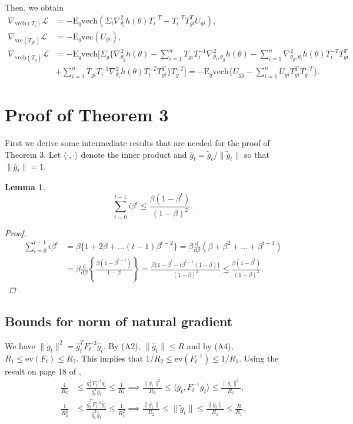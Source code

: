\documentclass{statsoc}
\newtheorem{lemma}{Lemma}
\newcommand\ev{{\text{ev}} }
\newcommand\df{{\text{d}}}
\newcommand\E{{\text{E}}}
\newcommand\mL{{\mathcal{L}}}
\newcommand{\vc}{\text{vec}}
\newcommand{\vech}{\text{vech}}
\begin{document}
Then, we obtain
\[
\begin{aligned}
\nabla_{\vech(T_i)} \mL &= - \E_q \vech (\Sigma_i  \nabla_{\theta_i}^2 h(\theta)  T_i^{-T} - T_i^{-T} T_{gi}^T U_{gi} ), \\
\nabla_{\vc(T_{gi})} \mL &= -\E_q \vc (U_{gi}), \\
\nabla_{\vech(T_g)} \mL &= - \E_q \vech\bigg[ \Sigma_g \bigg\{  \nabla_{\theta_g}^2 h(\theta) - \sum_{i=1}^n T_{gi} T_i^{-1} \nabla_{\theta_i, \theta_g}^2 h(\theta)  - \sum_{i=1}^n \nabla_{\theta_g, \theta_i}^2 h(\theta)T_i^{-T} T_{gi}^T \\
& +  \sum_{i=1}^n T_{gi} T_i^{-1} \nabla_{\theta_i}^2 h(\theta) T_i^{-T} T_{gi}^T \bigg\} T_g^{-T}\bigg] =- \E_q \vech \bigg\{ U_{gg} -  \sum_{i=1}^n U_{gi} T_{gi}^T T_g^{-T}\bigg\} .
\end{aligned}
\]




\section{Proof of Theorem 3} \label{S5}
First we derive some intermediate results that are needed for the proof of Theorem 3. Let $\langle \cdot, \cdot\rangle$ denote the inner product and $\bar{g}_{t}  = \widetilde{g}_t/\|\widetilde{g}_t\|$ so that $\|\bar{g}_t\| = 1$. 


\begin{lemma} \label{lem_beta}
\[
\sum_{i=0}^{t-1} i \beta^i \leq \frac{\beta(1-\beta^t)}{(1-\beta)^2}.
\]
\begin{proof}
\[
\begin{aligned}
\sum_{i=0}^{t-1} i \beta^i &= \beta \{1 + 2\beta + \dots (t-1) \beta^{t-2}\}
= \beta \frac{\df}{\df \beta} (\beta + \beta^2 + \dots + \beta^{t-1}) \\
&= \beta \frac{\df}{\df \beta} \left\{ \frac{\beta(1-\beta^{t-1})}{1-\beta} \right\}
= \frac{\beta \{1 - \beta^t - t \beta^{t-1} (1-\beta)\} }{(1-\beta)^2} \leq \frac{\beta(1-\beta^t)}{(1-\beta)^2}.
\end{aligned}
\]
\end{proof}
\end{lemma}


\subsection{Bounds for norm of natural gradient} 
We have $\| \widetilde{g}_t \|^2 = \widehat{g}_t^T  F_t^{-2}\widehat{g}_t$.  By (A2), $\|\widehat{g}_t\| \leq R$ and by (A4), $R_1 \leq \ev(F_t) \leq R_2$. This implies that $1/R_2 \leq \ev(F_t^{-1}) \leq 1/R_1$. Using the result on page 18 of \cite{Magnus2019},
\[
\begin{aligned}
\frac{1}{R_2} &\leq \frac{g_t^T  F_t^{-1}g_t}{g_t^T g_t} \leq \frac{1}{R_1}  
\implies \frac{\|g_t\|^2}{R_2} \leq \langle g_t, F_t^{-1}g_t \rangle  \leq \frac{\|g_t\|^2}{R_1}, \\
\frac{1}{R_2^2} &\leq \frac{\widehat{g}_t^T  F_t^{-2}\widehat{g}_t}{\widehat{g}_t^T  \widehat{g}_t} \leq \frac{1}{R_1^2}  
\implies \frac{\|\widehat{g}_t\|}{R_2} \leq \| \widetilde{g}_t \| \leq \frac{\|\widehat{g}_t\|}{R_1} \leq \frac{R}{R_1}. 
\end{aligned}
\]
\end{document}
